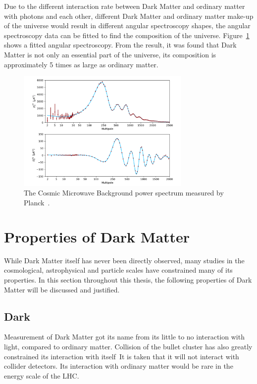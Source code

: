 Due to the different interaction rate between Dark Matter and ordinary matter with photons and each other, different Dark Matter and ordinary matter make-up of the universe would result in different angular spectroscopy shapes, the angular spectroscopy data can be fitted to find the composition of the universe. Figure~\ref{fig:CMBfigure} shows a fitted angular spectroscopy. From the result, it was found that Dark Matter is not only an essential part of the universe, its composition is approximately 5 times as large as ordinary matter. 

\begin{figure}[!htb]
    \begin{center}
        \includegraphics[width=0.75\textwidth]{figures/chapter_DM/CMB-angular-power-spectrum}
        \caption{
			The Cosmic Microwave Background power spectrum measured by Planck~\cite{CMB}.
        }
        \label{fig:CMBfigure}
    \end{center}
\end{figure}

\section{Properties of Dark Matter}
\label{section:properties}
While Dark Matter itself has never been directly observed, many studies in the cosmological, astrophysical and particle scales have constrained many of its properties. In this section throughout this thesis, the following properties of Dark Matter will be discussed and justified.

\subsection{Dark}
Measurement of Dark Matter got its name from its little to no interaction with light, compared to ordinary matter. Collision of the bullet cluster has also greatly constrained its interaction with itself\  
It is taken that it will not interact with collider detectors. Its interaction with ordinary matter would be rare in the energy scale of the LHC. 

